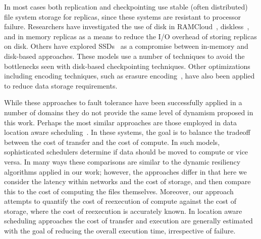 \documentclass{sig-alternate}
\begin{document}
In most cases both replication and checkpointing use stable (often distributed) file system storage for replicas, since these systems are resistant to processor failure. Researchers have investigated the use of disk in RAMCloud~\cite{ramcloud2011},  diskless~\cite{diskless1998, zhen04}, and in memory replicas as a means to reduce the I/O overhead of storing replicas on disk. Others have explored SSDs~\cite{diskless2010} as a compromise between in-memory and  disk-based approaches. These models use a number of techniques to avoid the bottlenecks seen with disk-based checkpointing techniques. Other optimizations including encoding techniques, such as erasure encoding~\cite{star2008, erasure2009}, have also been applied to reduce data storage requirements.


While these approaches to fault tolerance have been successfully applied in a number of domains they do not provide the same level of dynamism proposed in this work. Perhaps the most similar approaches are those employed in data location aware scheduling~\cite{diana2007,peris10location}. In these systems, the goal is to balance the tradeoff between the cost of transfer and the cost of compute. In such models, sophisticated schedulers determine if data should be moved to compute or vice versa. In many ways these comparisons are similar to the dynamic resiliency algorithms applied in our work; however, the approaches differ in that here we consider the latency within networks and the cost of storage, and then compare this to the cost of computing the files themselves. Moreover, our approach attempts to quantify the cost of reexecution of compute against the cost of storage, where the cost of reexecution is accurately known. In location aware scheduling approaches the cost of transfer and execution are generally estimated with the goal of reducing the overall execution time, irrespective of failure.  
\end{document}

